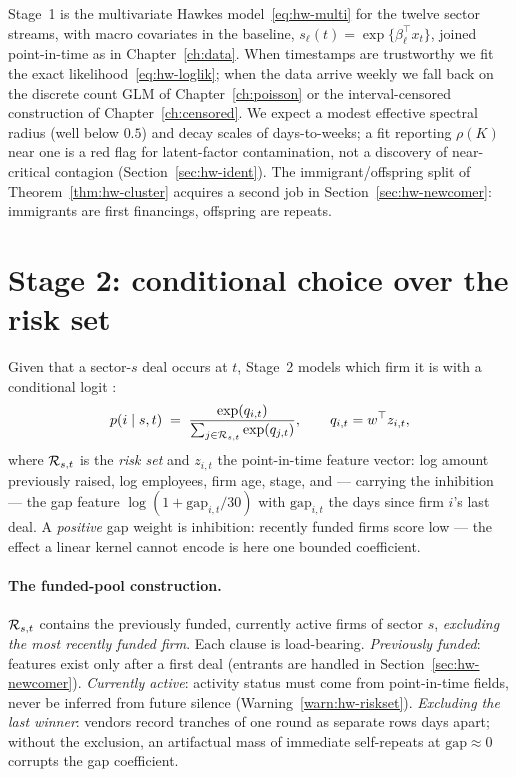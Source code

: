 Stage~1 is the multivariate Hawkes model~\eqref{eq:hw-multi} for the twelve sector
streams, with macro covariates in the baseline, $s_\ell(t) = \exp\{\beta_\ell^\top x_t\}$,
joined point-in-time as in Chapter~\ref{ch:data}. When timestamps are trustworthy we fit
the exact likelihood~\eqref{eq:hw-loglik}; when the data arrive weekly we fall back on the
discrete count GLM of Chapter~\ref{ch:poisson} \cite{fokianos2009} or the
interval-censored construction of Chapter~\ref{ch:censored}. We expect a modest effective
spectral radius (well below $0.5$) and decay scales of days-to-weeks; a fit reporting
$\rho(K)$ near one is a red flag for latent-factor contamination, not a discovery of
near-critical contagion (Section~\ref{sec:hw-ident}). The immigrant/offspring split of
Theorem~\ref{thm:hw-cluster} acquires a second job in Section~\ref{sec:hw-newcomer}:
immigrants are first financings, offspring are repeats.

\section{Stage 2: conditional choice over the risk set}
\label{sec:hw-stage2}

Given that a sector-$s$ deal occurs at $t$, Stage~2 models which firm it is with a
conditional logit \cite{mcfadden1974}:
\begin{equation}
\label{eq:hw-logit}
p(i \mid s, t) \;=\;
\frac{\exp(q_{i,t})}{\sum_{j \in \mathcal{R}_{s,t}} \exp(q_{j,t})},
\qquad
q_{i,t} = w^\top z_{i,t},
\end{equation}
where $\mathcal{R}_{s,t}$ is the \emph{risk set} and $z_{i,t}$ the point-in-time feature vector:
log amount previously raised, log employees, firm age, stage, and --- carrying the
inhibition --- the gap feature $\log(1 + \mathrm{gap}_{i,t}/30)$ with
$\mathrm{gap}_{i,t}$ the days since firm $i$'s last deal. A \emph{positive} gap weight is
inhibition: recently funded firms score low --- the effect a linear kernel cannot encode
is here one bounded coefficient.

\paragraph{The funded-pool construction.}
$\mathcal{R}_{s,t}$ contains the previously funded, currently active firms of sector $s$,
\emph{excluding the most recently funded firm}. Each clause is load-bearing.
\emph{Previously funded}: features exist only after a first deal (entrants are handled in
Section~\ref{sec:hw-newcomer}). \emph{Currently active}: activity status must come from
point-in-time fields, never be inferred from future silence
(Warning~\ref{warn:hw-riskset}). \emph{Excluding the last winner}: vendors record tranches
of one round as separate rows days apart; without the exclusion, an artifactual mass of
immediate self-repeats at $\mathrm{gap} \approx 0$ corrupts the gap coefficient.

